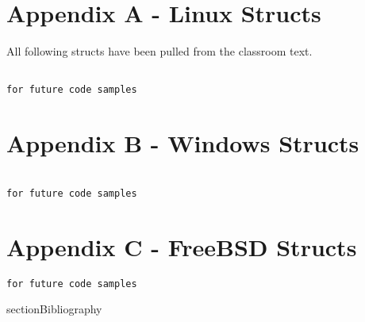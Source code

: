 \documentclass[10pt,letterpaper,onecolumn,draftclsnofoot]{IEEEtran}
\begin{document}
\clearpage
\section{Appendix A - Linux Structs}
All following structs have been pulled from the classroom text. \cite{robertlove2010}
\begin{lstlisting}

for future code samples

\end{lstlisting}

\section{Appendix B - Windows Structs}
\begin{lstlisting}

for future code samples
\end{lstlisting}
\section{Appendix C - FreeBSD Structs}
\begin{lstlisting}
for future code samples

\end{lstlisting}

section{Bibliography}


\end{document}

